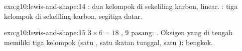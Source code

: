 \begin{solution}{exo:g10:lewis-and-shape:14}
: dua kelompok di sekeliling karbon, linear.
: tiga kelompok di sekeliling karbon, segitiga
datar.
\end{solution}

\begin{solution}{exo:g10:lewis-and-shape:15}
$3 \times 6 = 18$ , 9 pasang:
. Oksigen yang di tengah
memiliki tiga kelompok (satu , satu ikatan tunggal,
satu ):  bengkok.
\end{solution}

